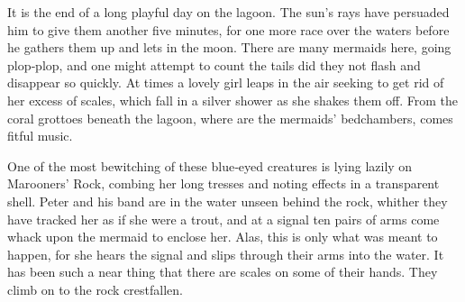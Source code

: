 

\begin{stagedir}
It is the end of a long playful day on the lagoon.
The sun’s rays have persuaded him to give them another five minutes,
for one more race over the waters before he gathers them up and lets in the moon.
There are many mermaids here, going plop‐plop,
and one might attempt to count the tails did they not flash and disappear so quickly.
At times a lovely girl leaps in the air seeking to get rid of her excess of scales,
which fall in a silver shower as she shakes them off.
From the coral grottoes beneath the lagoon, where are the mermaids’ bedchambers, comes fitful music.

One of the most bewitching of these blue‐eyed creatures is lying lazily on Marooners’ Rock,
combing her long tresses and noting effects in a transparent shell.
Peter and his band are in the water unseen behind the rock,
whither they have tracked her as if she were a trout,
and at a signal ten pairs of arms come whack upon the mermaid to enclose her.
Alas, this is only what was meant to happen, for she hears the signal
and slips through their arms into the water.
It has been such a near thing that there are scales on some of their hands.
They climb on to the rock crestfallen.
\end{stagedir}

